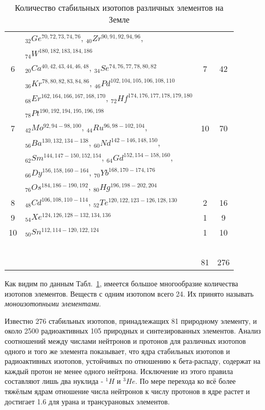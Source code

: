 \documentclass[a5paper,openany]{book}
\begin{document}
\begin{table}
{\begin{tabular}{cp{6cm}cc}
~ &  $_{32}Ge^{70, 72, 73, 74, 76}, \, _{40}Zr^{90, 91, 92, 94, 96}, $ & ~ & ~ \\ [1mm]
~ &  $_{74}W^{180, 182, 183, 184, 186} $ & ~ & ~ \\ [1mm]
6 &  $_{20}Ca^{40, 42, 43, 44, 46, 48}, \, _{34}Se^{74, 76, 77, 78, 80, 82} $ & 7 & 42 \\ [1mm]
~ &  $_{36}Kr^{78, 80, 82, 83, 84, 86},  \,_{46}Pd^{102, 104, 105, 106, 108, 110} $ & ~ & ~ \\ [1mm]
~ &  $_{68}Er^{162, 164, 166, 167, 168, 170},  \, _{72}Hf^{174, 176, 177, 178, 179, 180} $ & ~ & ~ \\ [1mm]
~ &  $_{78}Pt^{190, 192, 194, 195, 196, 198} $ & ~ & ~ \\ [1mm]
7 &  $_{42}Mo^{92, 94-98, 100}, \, _{44}Ru^{96, 98-102, 104}, \, $ & 10 & 70 \\ [1mm]
~ &  $_{56}Ba^{130, 132, 134-138}, \, _{60}Nd^{142-146, 148, 150}, $ & ~ & ~ \\ [1mm]
~ &  $_{62}Sm^{144, 147-150, 152, 154}, \, _{64}Gd^{152, 154-158, 160},$ & ~ & ~ \\ [1mm]
~ &  $_{66}Dy^{156, 158, 160-164}, \, _{70}Yb^{168, 170-174, 176} $ & ~ & ~ \\ [1mm]
~ &  $_{76}Os^{184, 186-190, 192}, \, _{80}Hg^{196, 198-202, 204} $ & ~ & ~ \\ [1mm]
8 &  $_{48}Cd^{106, 108,  110-114}, \, _{52}Te^{120, 122, 123-126, 128, 130}$ & 2 & 16 \\ [1mm]
9 &  $_{54}Xe^{124, 126, 128-132, 134, 136}$ & 1 & 9 \\ [1mm]
10 &  $_{50}Sn^{112, 114-120, 122, 124}$ & 1 & 10 \\ [1mm]
\hline
~ & ~ &  ~ &  ~\\
	~ & ~ & 81 & 276
	\end{tabular}
}
\caption{Количество стабильных изотопов различных элементов на Земле}
\label{t:IsotopeCounts}
\end{table} 


% 

Как видим по данным Табл.~\ref{t:IsotopeCounts}, имеется большое многообразие количества изотопов элементов. Веществ с одним изотопом всего 24. Их принято называть \emph{моноизотопными элементами}. 



Известно 276 стабильных изотопов, принадлежащих 81 природному элементу, и около 2500
радиоактивных 105 природных и синтезированных элементов.
Анализ соотношений между числами нейтронов и протонов для различных изотопов одного и того же
элемента показывает, что ядра стабильных изотопов и радиоактивных изотопов, устойчивых по отношению к
бета-распаду, содержат на каждый протон не менее одного нейтрона. Исключение из этого правила
составляют лишь два нуклида - $^1H$ и $^3He$. По мере перехода ко всё более тяжёлым ядрам отношение числа
нейтронов к числу протонов в ядре растет и достигает 1.6 для урана и трансурановых элементов.
\end{document}
